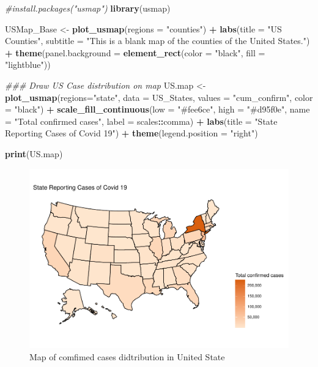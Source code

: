 \documentclass[12pt,]{article}
\newenvironment{Shaded}{\begin{snugshade}}{\end{snugshade}}
\newcommand{\CommentTok}[1]{\textcolor[rgb]{0.56,0.35,0.01}{\textit{#1}}}
\newcommand{\DataTypeTok}[1]{\textcolor[rgb]{0.13,0.29,0.53}{#1}}
\newcommand{\KeywordTok}[1]{\textcolor[rgb]{0.13,0.29,0.53}{\textbf{#1}}}
\newcommand{\NormalTok}[1]{#1}
\newcommand{\OperatorTok}[1]{\textcolor[rgb]{0.81,0.36,0.00}{\textbf{#1}}}
\newcommand{\StringTok}[1]{\textcolor[rgb]{0.31,0.60,0.02}{#1}}
\begin{document}
\begin{Shaded}
\begin{Highlighting}[]
\CommentTok{#install.packages("usmap")}
\KeywordTok{library}\NormalTok{(usmap)}

\NormalTok{USMap_Base <-}\StringTok{ }\KeywordTok{plot_usmap}\NormalTok{(}\DataTypeTok{regions =} \StringTok{"counties"}\NormalTok{) }\OperatorTok{+}\StringTok{ }
\StringTok{  }\KeywordTok{labs}\NormalTok{(}\DataTypeTok{title =} \StringTok{"US Counties"}\NormalTok{,}
       \DataTypeTok{subtitle =} \StringTok{"This is a blank map of the counties of the United States."}\NormalTok{) }\OperatorTok{+}\StringTok{ }
\StringTok{  }\KeywordTok{theme}\NormalTok{(}\DataTypeTok{panel.background =} \KeywordTok{element_rect}\NormalTok{(}\DataTypeTok{color =} \StringTok{"black"}\NormalTok{, }\DataTypeTok{fill =} \StringTok{"lightblue"}\NormalTok{))}


\CommentTok{### Draw US Case distribution on map}
\NormalTok{US.map <-}\StringTok{ }\KeywordTok{plot_usmap}\NormalTok{(}\DataTypeTok{regions=}\StringTok{"state"}\NormalTok{, }\DataTypeTok{data =}\NormalTok{ US_States, }
                                \DataTypeTok{values =} \StringTok{"cum_confirm"}\NormalTok{, }\DataTypeTok{color =} \StringTok{"black"}\NormalTok{) }\OperatorTok{+}
\StringTok{  }\KeywordTok{scale_fill_continuous}\NormalTok{(}\DataTypeTok{low =} \StringTok{"#fee6ce"}\NormalTok{, }\DataTypeTok{high =} \StringTok{"#d95f0e"}\NormalTok{, }
                        \DataTypeTok{name =} \StringTok{"Total confirmed cases"}\NormalTok{, }\DataTypeTok{label =}\NormalTok{ scales}\OperatorTok{::}\NormalTok{comma) }\OperatorTok{+}\StringTok{ }
\StringTok{  }\KeywordTok{labs}\NormalTok{(}\DataTypeTok{title =} \StringTok{"State Reporting Cases of Covid 19"}\NormalTok{) }\OperatorTok{+}
\StringTok{  }\KeywordTok{theme}\NormalTok{(}\DataTypeTok{legend.position =} \StringTok{"right"}\NormalTok{)}

\KeywordTok{print}\NormalTok{(US.map)}
\end{Highlighting}
\end{Shaded}

\begin{figure}
\centering
\includegraphics{Feng_ENV872_Project_files/figure-latex/US.map-1.pdf}
\caption{Map of comfimed cases didtribution in United State}
\end{figure}
\end{document}
